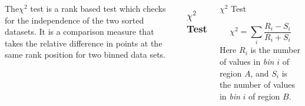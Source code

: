 \documentclass[9pt]{beamer}
\begin{document}
\begin{frame}
\begin{columns}
The$\chi^{2}$ test is a rank based test which checks for the independence of the two sorted datasets. It is a comparison measure that takes the relative difference in points at the same rank position for two binned data sets.
\frametitle{$\chi^{2}$ Test}
\begin{block}{$\chi^{2}$ Test}

\begin{equation}
\chi^{2} = \sum_{i} \frac{R_{i}-S_{i}}{R_{i} + S_{i}}
\end{equation}
Here $R_{i}$ is the number of values in \textit{bin} $i$ of region $A$, and $S_{i}$ is the number of values in  \textit{bin} $i$ of region $B$.
\end{block}
\end{columns}
\end{frame}
\end{document}
